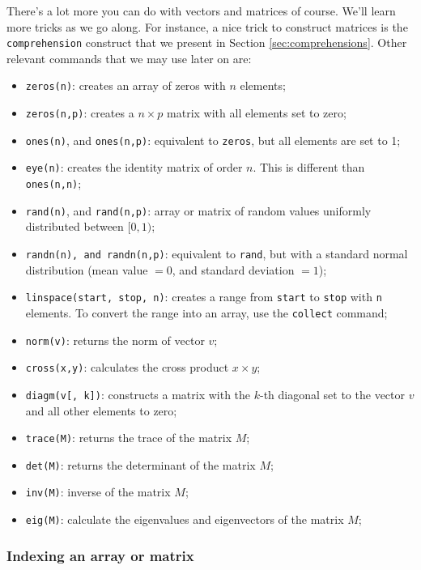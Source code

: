 There's a lot more you can do with vectors and matrices of course. We'll learn more tricks as we go along. For instance, a nice trick to construct matrices is the \texttt{comprehension} construct that we present in Section \ref{sec:comprehensions}. Other relevant commands that we may use later on are:

\begin{itemize}
 \item \texttt{zeros(n)}: creates an array of zeros with $n$ elements;
 \item \texttt{zeros(n,p)}: creates a $n\times p$ matrix with all elements set to zero;
 \item \texttt{ones(n)}, and \texttt{ones(n,p)}: equivalent to \texttt{zeros}, but all elements are set to 1;
 \item \texttt{eye(n)}: creates the identity matrix of order $n$. This is different than \texttt{ones(n,n)};
 \item \texttt{rand(n)}, and \texttt{rand(n,p)}: array or matrix of random values uniformly distributed between $[0,1)$;
 \item \texttt{randn(n), and \texttt{randn(n,p)}}: equivalent to \texttt{rand}, but with a standard normal distribution (mean value $=0$, and standard deviation $=1$);
 \item \texttt{linspace(start, stop, n)}: creates a range from \texttt{start} to \texttt{stop} with \texttt{n} elements. To convert the range into an array, use the \texttt{collect} command;  
 \item \texttt{norm(v)}: returns the norm of vector $v$;
 \item \texttt{cross(x,y)}: calculates the cross product $x \times y$;
 \item \texttt{diagm(v[, k])}: constructs a matrix with the $k$-th diagonal set to the vector $v$ and all other elements to zero;
 \item \texttt{trace(M)}: returns the trace of the matrix $M$;
 \item \texttt{det(M)}: returns the determinant of the matrix $M$;
 \item \texttt{inv(M)}: inverse of the matrix $M$;
 \item \texttt{eig(M)}: calculate the eigenvalues and eigenvectors of the matrix $M$;
\end{itemize}

\subsubsection{Indexing an array or matrix}

